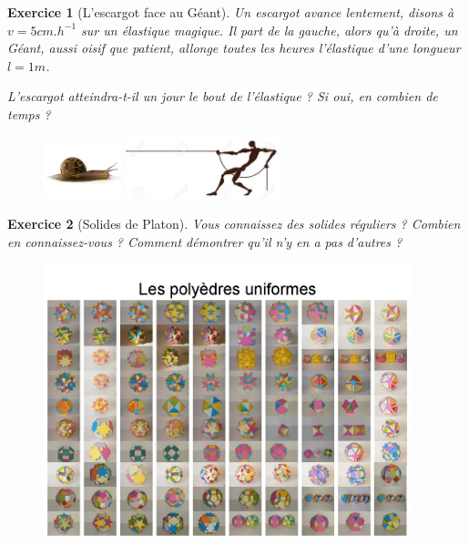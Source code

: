 \documentclass[12pt]{article}
\theoremstyle{break}
\newtheorem{exo}{Exercice}
\begin{document}
\begin{exo}[L'escargot face au Géant]
Un escargot avance lentement, disons à $v = 5 cm.h^{-1}$ sur un élastique magique. Il part de la gauche, alors qu'à droite, un Géant, aussi oisif que patient, allonge toutes les heures l'élastique d'une longueur $l = 1 m$.

L'escargot atteindra-t-il un jour le bout de l'élastique ? Si oui, en combien de temps ?
\begin{figure}[!ht]
	\centering
    \includegraphics[width=0.2\textwidth]{images/Escargot.jpg}
    \includegraphics[width=0.4\textwidth]{images/Geant.jpg}

\end{figure}
\end{exo}


\begin{exo}[Solides de Platon]
Vous connaissez des solides réguliers ? Combien en connaissez-vous ? Comment démontrer qu'il n'y en a pas d'autres ?

\begin{figure}[!ht]
	\centering
    \includegraphics[width=0.95\textwidth]{images/PolyedreUniforme.jpg}

\end{figure}
\end{exo}
\end{document}
